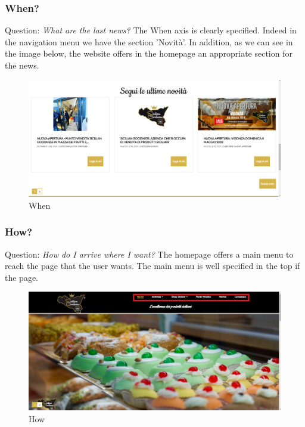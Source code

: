 \subsubsection{When?}

Question: \textit{What are the last news?}
\newline
The When axis is clearly specified. Indeed in the navigation menu we have the section 'Novità'.
In addition, as we can see in the image below, the website offers in the homepage an appropriate section for the news.

\begin{figure}[H]
	\centering\includegraphics[width=12cm]{Img/news.png}
	\caption{When}
\end{figure}

\subsubsection{How?}

Question: \textit{How do I arrive where I want?}
\newline
The homepage offers a main menu to reach the page that the user wants. The main menu is well specified in the top if the page.

\begin{figure}[H]
	\centering\includegraphics[width=12cm]{Img/how.png}
	\caption{How}
\end{figure}

